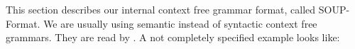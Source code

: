 
\section{}

This section describes our internal context free grammar format,
called SOUP-Format. We are usually using semantic instead of syntactic
context free grammars. They are read by . A not
completely specified example looks like:

